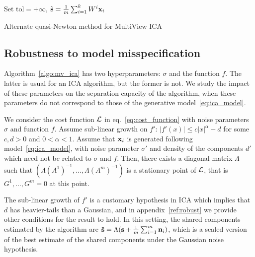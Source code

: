 \documentclass[12pt]{report}
\begin{document}
\begin{algorithm}
\label{algo:mv_ica}
\SetAlgoLined
{}
Set tol$=+\infty$, $\tilde{\mathbf{s}} = \frac1m\sum_{i=1}^kW^i\mathbf{x}_i$\\
 \caption{Alternate quasi-Newton method for MultiView ICA}
\end{algorithm}
%
%
%
%
\subsection{Robustness to model misspecification}
Algorithm~\ref{algo:mv_ica} has two hyperparameters: $\sigma$ and the function $f$.
%
The latter is usual for an ICA algorithm, but the former is not.
%
We study the impact of these parameters on the separation capacity of the algorithm, when these parameters do not correspond to those of the generative model~\eqref{eq:ica_model}.
%
\begin{proposition}
\label{prop:robust}
We consider the cost function $\mathcal{L}$ in eq.~\eqref{eq:cost_function} with noise parameters $\sigma$ and function $f$.
%
Assume sub-linear growth on $f'$: $|f'(x)|\leq c|x|^{\alpha} + d$ for some $c, d > 0$ and $0<\alpha<1$.
%
Assume that $\mathbf{x}_i$ is generated following model~\eqref{eq:ica_model}, with noise parameter $\sigma'$ and density of the components $d'$ which need not be related to $\sigma$ and $f$.
%
Then, there exists a diagonal matrix $\Lambda$ such that $(\Lambda (A^1)^{-1}, \dots, \Lambda (A^m)^{-1})$ is a stationary point of $\mathcal{L}$, that is $G^1,\dots, G^m =0$ at this point.
\end{proposition}
%
The sub-linear growth of $f'$ is a customary hypothesis in ICA which implies that $d$ has heavier-tails than a Gaussian, and in appendix~\ref{ref:robust} we provide other conditions for the result to hold.
%
In this setting, the shared components estimated by the algorithm are $\tilde{\mathbf{s}} = \Lambda (\mathbf{s} + \frac1m \sum_{i=1}^m \mathbf{n}_i)$, which is a scaled version of the best estimate of the shared components under the Gaussian noise hypothesis.
\end{document}
